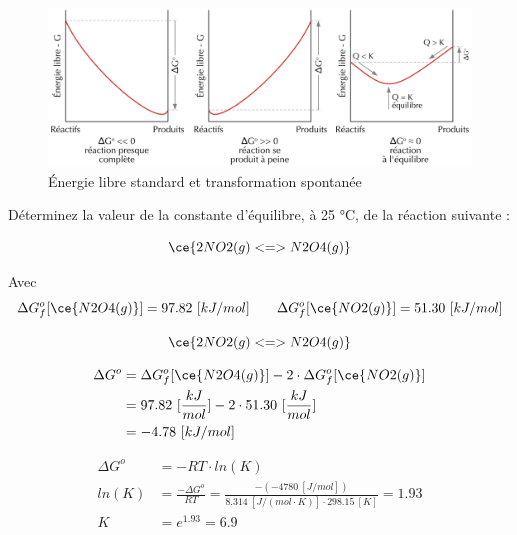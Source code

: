 \documentclass[
  11pt,
  a4paper,
  openany]{book}
\begin{document}
\begin{figure}

{\centering \includegraphics[width=1\linewidth]{images/dG-profile} 

}

\caption{Énergie libre standard et transformation spontanée}\label{fig:dG-profile}
\end{figure}

\clearpage

\begin{Exercise}

Déterminez la valeur de la constante d'équilibre, à 25 °C, de la réaction suivante :

\[
\ce{2 NO2(g) <=> N2O4(g)}
\]

Avec
\[
\begin{split}
\Delta G^o_f[\ce{N2O4(g)}] = 97.82\ [kJ/mol]
\end{split}
\qquad
\begin{split}
\Delta G^o_f[\ce{NO2(g)}] = 51.30\ [kJ/mol]
\end{split}
\]


\end{Exercise}

\begin{Answer}

\[
\ce{2 NO2(g) <=> N2O4(g)}
\]

\[
\begin{split}
\Delta G^o &= \Delta G^o_f[\ce{N2O4(g)}] - 2 \cdot \Delta G^o_f[\ce{NO2(g)}] \\
&= 97.82\ [\frac{kJ}{mol}] - 2 \cdot 51.30\ [\frac{kJ}{mol}] \\
&= -4.78\ [kJ/mol]
\end{split}
\]

\[
\begin{split}
\Delta G^o &= - RT \cdot ln(K) \\
ln(K) &= \frac{- \Delta G^o}{RT} = \frac{- (-4780\ [J/mol])}{8.314\ [J/(mol \cdot K)] \cdot 298.15\ [K]} = 1.93 \\
K &= e^{1.93} = 6.9
\end{split}
\]

\clearpage

\end{Answer}
\end{document}
